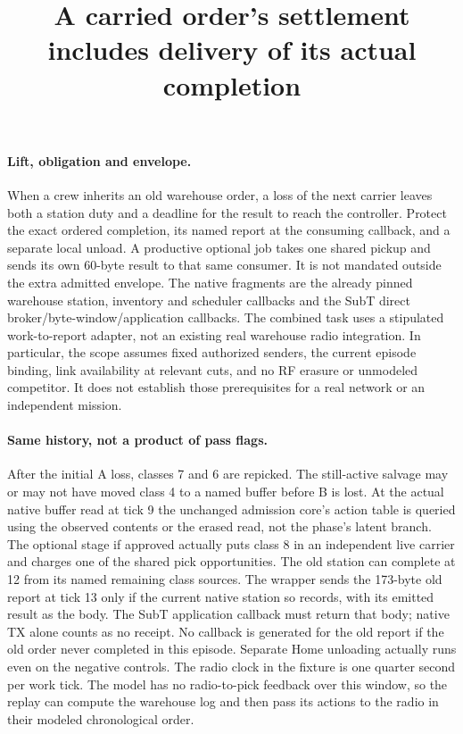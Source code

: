 \documentclass[11pt]{article}
\title{A carried order's settlement includes delivery of its actual completion}
\begin{document}
\maketitle
\paragraph{Lift, obligation and envelope.}
When a crew inherits an old warehouse order, a loss of the next
carrier leaves both a station duty and a deadline for the result
to reach the controller. Protect the exact ordered completion,
its named report at the consuming callback, and a separate
local unload. A productive optional job takes one shared pickup
and sends its own 60-byte result to that same consumer. It is
not mandated outside the extra admitted envelope.
The native fragments are the already pinned warehouse station,
inventory and scheduler callbacks and the SubT direct
broker/byte-window/application callbacks. The combined task
uses a stipulated work-to-report adapter, not an existing real
warehouse radio integration. In particular, the scope assumes
fixed authorized senders, the current episode binding, link
availability at relevant cuts, and no RF erasure or unmodeled
competitor. It does not establish those prerequisites for a
real network or an independent mission.

\paragraph{Same history, not a product of pass flags.}
After the initial A loss, classes 7 and 6 are repicked. The
still-active salvage may or may not have moved class 4 to a
named buffer before B is lost. At the actual native buffer read
at tick 9 the unchanged admission core's action table is
queried using the observed contents or the erased read, not
the phase's latent branch. The optional stage if approved
actually puts class 8 in an independent live carrier and
charges one of the shared pick opportunities. The old
station can complete at 12 from its named remaining class
sources. The wrapper sends the 173-byte old report at tick 13
only if the current native station so records, with its
emitted result as the body. The SubT application callback must
return that body; native TX alone counts as no receipt.
No callback is generated for the old report if the old order
never completed in this episode. Separate Home unloading
actually runs even on the negative controls. The radio clock
in the fixture is one quarter second per work tick.
The model has no radio-to-pick feedback over this window,
so the replay can compute the warehouse log and then pass
its actions to the radio in their modeled chronological order.
\end{document}
